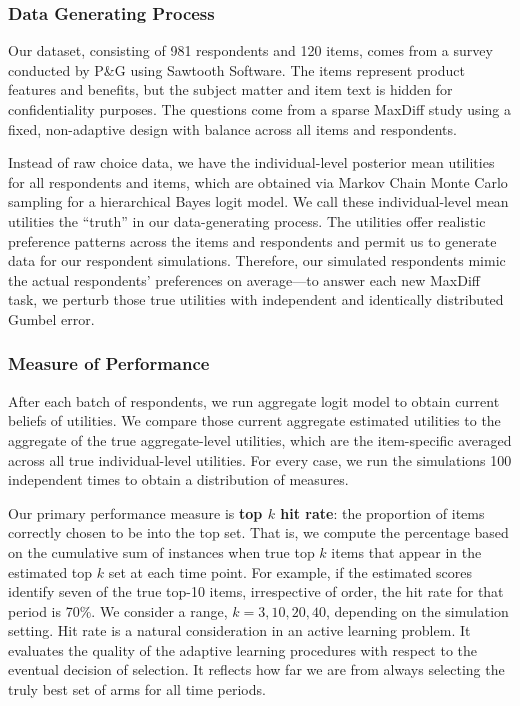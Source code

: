 \documentclass[nonblindrev]{informs3}
\begin{document}
\subsubsection{Data Generating Process}

Our dataset, consisting of 981 respondents and 120 items, comes from a survey conducted by P\&G using Sawtooth Software. The items represent product features and benefits, but the subject matter and item text is hidden for confidentiality purposes. The questions come from a sparse MaxDiff study using a fixed, non-adaptive design with balance across all items and respondents. 

Instead of raw choice data, we have the individual-level posterior mean utilities for all respondents and items, which are obtained via Markov Chain Monte Carlo sampling for a hierarchical Bayes logit model. We call these individual-level mean utilities the ``truth'' in our data-generating process. The utilities offer realistic preference patterns across the items and respondents and permit us to generate data for our respondent simulations.  Therefore, our simulated respondents mimic the actual respondents' preferences on average---to answer each new MaxDiff task, we perturb those true utilities with independent and identically distributed Gumbel error. 

\subsubsection{Measure of Performance}

After each batch of respondents, we run aggregate logit model to obtain current beliefs of utilities. We compare those current aggregate estimated utilities to the aggregate of the true aggregate-level utilities, which are the item-specific averaged across all true individual-level utilities. For every case, we run the simulations 100 independent times to obtain a distribution of measures. 

Our primary performance measure is \textbf{top $k$ hit rate}: the proportion of items correctly chosen to be into the top set. That is, we compute the percentage based on the cumulative sum of instances when true top $k$ items that appear in the estimated top $k$ set at each time point. For example, if the estimated scores identify seven of the true top-10 items, irrespective of order, the hit rate for that period is 70\%. We consider a range, $k=3,10,20,40$, depending on the simulation setting. Hit rate is a natural consideration in an active learning problem. It evaluates the quality of the adaptive learning procedures with respect to the eventual decision of selection. It reflects how far we are from always selecting the truly best set of arms for all time periods. 
\end{document}
